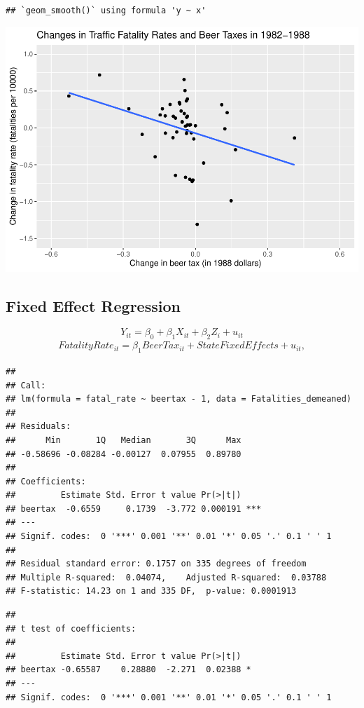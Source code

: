 \documentclass[
]{article}
\begin{document}
\begin{verbatim}
## `geom_smooth()` using formula 'y ~ x'
\end{verbatim}

\includegraphics{Panel_data_files/figure-latex/unnamed-chunk-3-1.pdf}

\hypertarget{fixed-effect-regression}{%
\subsection{Fixed Effect Regression}\label{fixed-effect-regression}}

\[Y_{it} = \beta_0 + \beta_1 X_{it} + \beta_2 Z_i +  u_{it}\]
\[\begin{align}
FatalityRate_{it} = \beta_1 BeerTax_{it} + StateFixedEffects + u_{it}, \tag{10.6}
\end{align}\]

\begin{verbatim}
## 
## Call:
## lm(formula = fatal_rate ~ beertax - 1, data = Fatalities_demeaned)
## 
## Residuals:
##      Min       1Q   Median       3Q      Max 
## -0.58696 -0.08284 -0.00127  0.07955  0.89780 
## 
## Coefficients:
##         Estimate Std. Error t value Pr(>|t|)    
## beertax  -0.6559     0.1739  -3.772 0.000191 ***
## ---
## Signif. codes:  0 '***' 0.001 '**' 0.01 '*' 0.05 '.' 0.1 ' ' 1
## 
## Residual standard error: 0.1757 on 335 degrees of freedom
## Multiple R-squared:  0.04074,    Adjusted R-squared:  0.03788 
## F-statistic: 14.23 on 1 and 335 DF,  p-value: 0.0001913
\end{verbatim}

\begin{verbatim}
## 
## t test of coefficients:
## 
##         Estimate Std. Error t value Pr(>|t|)  
## beertax -0.65587    0.28880  -2.271  0.02388 *
## ---
## Signif. codes:  0 '***' 0.001 '**' 0.01 '*' 0.05 '.' 0.1 ' ' 1
\end{verbatim}
\end{document}
